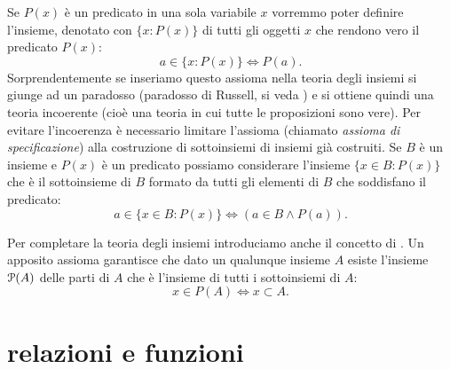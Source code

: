 Se $P(x)$ è un predicato in una sola variabile $x$ vorremmo poter
definire l'insieme, denotato con $\{x\colon P(x)\}$
di tutti gli oggetti $x$ che rendono vero il predicato $P(x)$:
\[
  a \in \{x\colon P(x)\} \iff P(a).
\]
Sorprendentemente se inseriamo questo assioma nella teoria degli insiemi
si giunge ad un paradosso (paradosso di Russell, si veda \cite{appunti_logica})
e si ottiene quindi una teoria incoerente
(cioè una teoria in cui tutte le proposizioni sono vere). Per evitare
l'incoerenza è necessario limitare l'assioma (chiamato \emph{assioma di specificazione})
alla costruzione di sottoinsiemi di insiemi già costruiti.
Se $B$ è un insieme e $P(x)$ è un predicato possiamo considerare
l'insieme $\{x\in B\colon P(x)\}$ che è il sottoinsieme di
$B$ formato da tutti gli elementi di $B$
che soddisfano il predicato:
\[
  a \in \{x\in B\colon P(x)\} \iff (a \in B \land P(a)).
\]

Per completare la teoria degli insiemi introduciamo anche il concetto di
. Un apposito assioma garantisce
che dato un qualunque insieme $A$ esiste l'insieme $\P(A)$ delle parti di $A$
che è l'insieme di tutti i sottoinsiemi di $A$:
\[
  x \in P(A) \iff x \subset A.
\]

\begin{comment}
\section{numeri naturali}
%
La teoria degli insiemi prevede che ogni ``oggetto''
sia in effetti un insieme.
Possiamo ad esempio definire i numeri naturali partendo dall'insieme
vuoto e costruendo insiemi di insiemi, così:
\begin{align*}
  0 = \emptyset, \qquad
  1 = \{0\}, \qquad
  2 = \{0,1\}, \qquad
  3 = \{0,1,2\}, \qquad
  4 = \{0,1,2,3\}, \\
  5 = \{0,1,2,3,4\}, \qquad
  6 = \{0,1,2,3,4,5\}, \qquad
  7 = \{0,1,2,3,4,5,6\}, \\
  8 = \{0,1,2,3,4,5,6,7\}, \qquad
  9 = \{0,1,2,3,4,5,6,7,8\}.
\end{align*}
Risulta quindi che l'$n$-esimo numero naturale coincide
con l'insieme dei primi $n$ numeri naturali.
Ovviamente potremmo andare avanti: se $n$ è un numero naturale
il successivo non è altro che $n\cup \{n\}$.
\end{comment}

\section{relazioni e funzioni}

